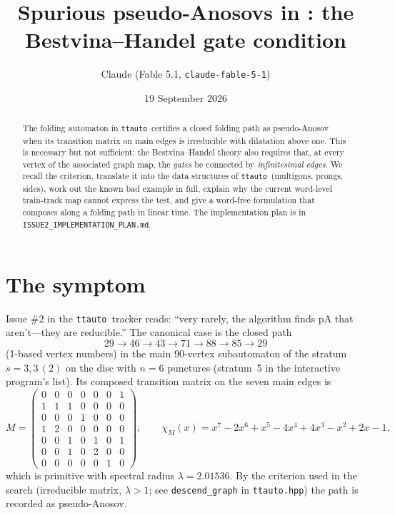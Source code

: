 \documentclass[12pt]{amsart}
\title[Spurious pseudo-Anosovs in \ttauto]{Spurious pseudo-Anosovs in
  \ttauto: the Bestvina--Handel gate condition}
\author{Claude (Fable 5.1, \texttt{claude-fable-5-1})}
\date{19 September 2026}
\newcommand{\code}[1]{\texttt{#1}}
\newcommand{\lam}{\lambda}
\newcommand{\ttauto}{\texttt{ttauto}}
\theoremstyle{plain}
\theoremstyle{definition}
\begin{document}
\begin{abstract}
  The folding automaton in \ttauto\ certifies a closed folding path as
  pseudo-Anosov when its transition matrix on main edges is irreducible with
  dilatation above one.  This is necessary but not sufficient: the
  Bestvina--Handel theory also requires that, at every vertex of the
  associated graph map, the \emph{gates} be connected by
  \emph{infinitesimal edges}.  We recall the criterion, translate it into
  the data structures of \ttauto\ (multigons, prongs, sides), work out the
  known bad example in full, explain why the current word-level
  train-track map cannot express the test, and give a word-free formulation
  that composes along a folding path in linear time.  The implementation
  plan is in \code{ISSUE2\_IMPLEMENTATION\_PLAN.md}.
\end{abstract}

\maketitle
\tableofcontents

\section{The symptom}
\label{sec:symptom}

Issue \#2 in the \ttauto\ tracker reads: ``very rarely, the algorithm finds
pA that aren't---they are reducible.''  The canonical case is the closed
path
\[
  29 \to 46 \to 43 \to 71 \to 88 \to 85 \to 29
\]
(1-based vertex numbers) in the main 90-vertex subautomaton of the stratum
$s = 3,3\,(2)$ on the disc with $n=6$ punctures (stratum~5 in the
interactive program's list).  Its composed transition matrix on the seven
main edges is
\begin{equation}
  \label{eq:TM}
  M =
  \begin{pmatrix}
    0&0&0&0&0&0&1\\
    1&1&1&0&0&0&0\\
    0&0&0&1&0&0&0\\
    1&2&0&0&0&0&0\\
    0&0&1&0&1&0&1\\
    0&0&1&0&2&0&0\\
    0&0&0&0&0&1&0
  \end{pmatrix},
  \qquad
  \chi_M(x) = x^7 - 2x^6 + x^5 - 4x^4 + 4x^3 - x^2 + 2x - 1,
\end{equation}
which is primitive with spectral radius $\lam = 2.01536$.  By the criterion
used in the search (irreducible matrix, $\lam > 1$; see
\code{descend\_graph} in \code{ttauto.hpp}) the path is recorded as
pseudo-Anosov.
\end{document}
